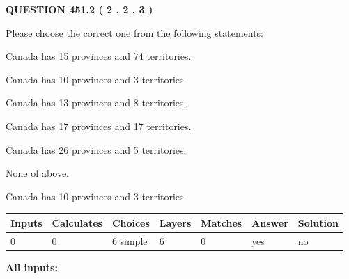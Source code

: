 \documentclass[12pt]{article}
\begin{document}
   
  
\vspace{0.2in}
  
{\textbf{\Large{QUESTION
451.2 
 ( 2 , 2 , 3 )
}}}
  
  
Please choose the correct one from the following statements:
 
 
Canada has  15 provinces and  74 territories.
 
 
Canada has 10  provinces and 3 territories.
 
 
Canada has  13 provinces and  8 territories.
 
 
Canada has  17 provinces and  17 territories.
 
 
Canada has  26 provinces and  5 territories.
 
 
 None of above.
 
 
\noindent{}
 
 
Canada has 10  provinces and 3 territories.
 
 
\noindent{}
 
 
   
   
   
   
\noindent\begin{tabular}{|l|l|l|l|l|l|l|}
 \hline
Inputs & Calculates & Choices & Layers & Matches & Answer & Solution \\ \hline
 0  & 
 0  & 
 6
  simple  
  & 
 6  & 
 0  & 
  yes & 
  no 
  \\ \hline
 \end{tabular}
   
   
   
   
\noindent{}
   
   
   
   
\noindent\vspace{0.1in}\hspace{-0.08in} {\textbf{\Large{All inputs: }}}
   
   
   
   
   
   
 \vspace{0.2in}
 
\end{document}
